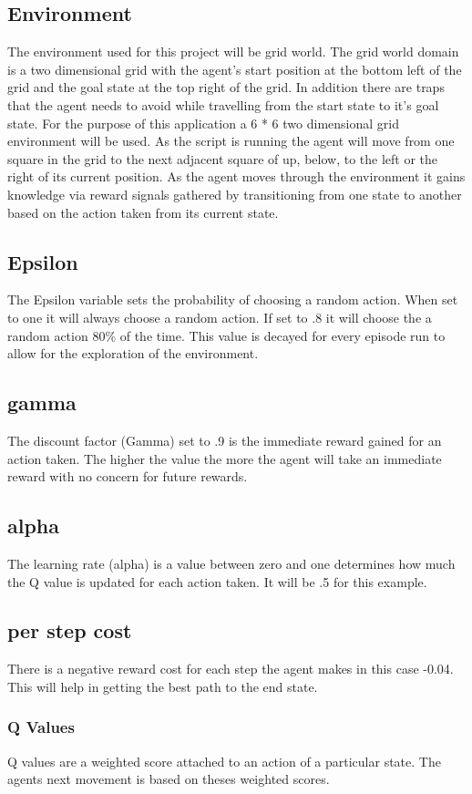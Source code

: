 \subsection{Environment}
The environment used for this project will be grid world. The  grid world domain is a two dimensional grid with the agent's start position at the bottom left of the grid and the goal state at the top right of the grid. In addition there are traps that the agent needs to avoid while travelling from the start state to it's goal state.
For the purpose of this application a  6 * 6 two dimensional grid environment will be used. As the script is running the agent will move from one square in the grid to the next adjacent square of up, below, to the left or the right of its current position. As the agent moves through the environment it gains knowledge via reward signals gathered by transitioning from one state to another based on the action taken from its current state.
\subsection{Epsilon}
The Epsilon variable sets the probability of choosing a random action. When set to one it will always choose a random action. If set to .8 it will choose the a random action 80\% of the time. This value is decayed for every episode run to allow for the exploration of the environment.
\subsection{gamma}
The discount factor (Gamma) set to .9 is the immediate reward gained for an action taken. The higher the value the more the agent will take an immediate reward with no concern for future rewards.
\subsection{alpha}
The learning rate (alpha) is a value between zero and one determines how much the Q value is updated for each action taken. It will be .5 for this example.
\subsection{per step cost}
There is a negative reward cost for each step the agent makes in this case -0.04. This will help in getting the best path to the end state.
\subsubsection{Q Values}
 Q values are a weighted score attached to an action of a particular state.
 The agents next movement is based on theses weighted scores.

